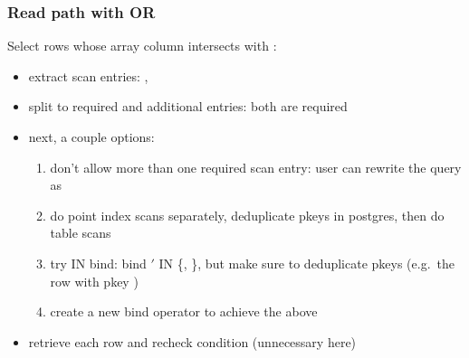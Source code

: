 \begin{frame}
  \frametitle{Read path with OR}
  Select rows whose array column intersects with :

  \pause

  \begin{itemize}
    \item extract scan entries: , 
      \pause
    \item split to required and additional entries: both are required
      \pause
    \item next, a couple options:
      \pause
      \begin{enumerate}
        \item don't allow more than one required scan entry: user can rewrite
          the query as 
          \pause
        \item do point index scans separately, deduplicate pkeys in postgres,
          then do table scans
        \item try IN bind: bind $'$ IN \{,
          \}, but make sure to deduplicate pkeys (e.g.\ the row
          with pkey )
          \pause
        \item create a new bind operator to achieve the above
          \pause
      \end{enumerate}
      \pause
    \item retrieve each row and recheck condition (unnecessary here)
  \end{itemize}
\end{frame}
